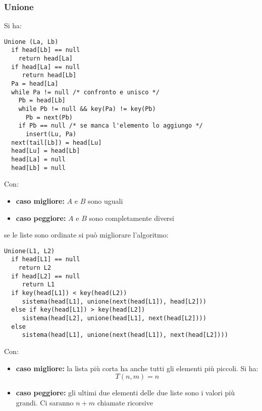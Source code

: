 \documentclass[a4paper,12pt,oneside,tikz]{book}
\begin{document}
\subsubsection{Unione}
Si ha:
\begin{verbatim}
Unione (La, Lb)
  if head[Lb] == null
    return head[La]
  if head[La] == null
     return head[Lb]
  Pa = head[La]
  while Pa != null /* confronto e unisco */
    Pb = head[Lb]
    while Pb != null && key(Pa) != key(Pb)
      Pb = next(Pb)
    if Pb == null /* se manca l'elemento lo aggiungo */
      insert(Lu, Pa)
  next(tail[Lb]) = head[Lu]
  head[Lu] = head[Lb]
  head[La] = null
  head[Lb] = null
\end{verbatim}
Con:
\begin{itemize}
\item \textbf{caso migliore:} $A$ e $B$ sono uguali
\item \textbf{caso peggiore:} $A$ e $B$ sono completamente diversi
\end{itemize}
\newpage
se le liste sono ordinate si può migliorare l'algoritmo:
\begin{verbatim}
Unione(L1, L2)
  if head[L1] == null
    return L2
  if head[L2] == null
     return L1
  if key(head[L1]) < key(head(L2))
     sistema(head[L1], unione(next(head[L1]), head[L2]))
  else if key(head[L1]) > key(head[L2])
     sistema(head[L2], unione(head[L1], next(head[L2])))
  else
     sistema(head[L1], unione(next(head[L1]), next(head[L2])))
\end{verbatim}
Con:
\begin{itemize}
\item \textbf{caso migliore:} la lista più corta ha anche tutti gli elementi più piccoli. Si ha:
$$T(n,m)=n$$
\item \textbf{caso peggiore:} gli ultimi due elementi delle due liste sono i valori più grandi. Ci saranno $n+m$ chiamate ricorsive
\end{itemize}
\end{document}
